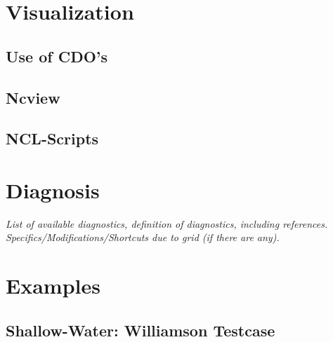 \documentclass[a4paper,10pt]{article}
\begin{document}
\section{Visualization}


\subsection{Use of CDO's}

\subsection{Ncview}

\subsection{NCL-Scripts}

\section{Diagnosis}
{\it List of available diagnostics, definition of diagnostics, including references.
Specifics/Modifications/Shortcuts due to grid (if there are any).} 


\section{Examples}

\subsection{Shallow-Water: Williamson Testcase}
\end{document}
